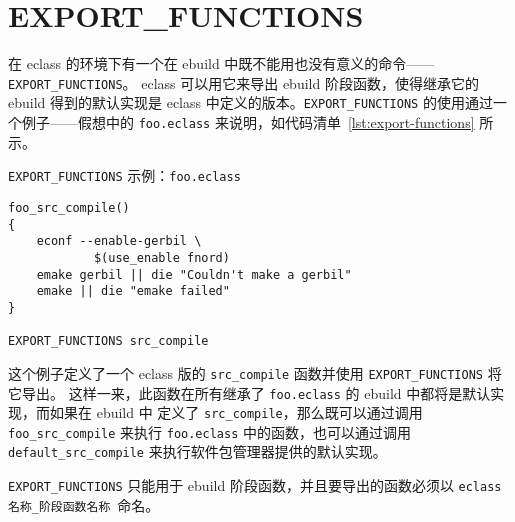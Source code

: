 \section{EXPORT_FUNCTIONS}

在 eclass 的环境下有一个在 ebuild 中既不能用也没有意义的命令——\texttt{EXPORT_FUNCTIONS}。
eclass 可以用它来导出 ebuild 阶段函数，使得继承它的 ebuild 得到的默认实现是 eclass
中定义的版本。\texttt{EXPORT_FUNCTIONS} 的使用通过一个例子——假想中的 \texttt{foo.eclass}
来说明，如代码清单~\ref{lst:export-functions} 所示。

\begin{listing}[h]
\caption{\texttt{EXPORT_FUNCTIONS} 示例：\texttt{foo.eclass}} \label{lst:export-functions}
\begin{verbatim}
foo_src_compile()
{
    econf --enable-gerbil \
            $(use_enable fnord)
    emake gerbil || die "Couldn't make a gerbil"
    emake || die "emake failed"
}

EXPORT_FUNCTIONS src_compile
\end{verbatim}
\end{listing}

这个例子定义了一个 eclass 版的 \texttt{src_compile} 函数并使用 \texttt{EXPORT_FUNCTIONS} 将它导出。
这样一来，此函数在所有继承了 \texttt{foo.eclass} 的 ebuild 中都将是默认实现，而如果在 ebuild 中
定义了 \texttt{src_compile}，那么既可以通过调用 \texttt{foo_src_compile} 来执行 \texttt{foo.eclass}
中的函数，也可以通过调用 \texttt{default_src_compile} 来执行软件包管理器提供的默认实现。

\texttt{EXPORT_FUNCTIONS} 只能用于 ebuild 阶段函数，并且要导出的函数必须以
\texttt{eclass\hspace{0em}名称_阶段函数名称}\ 命名。



